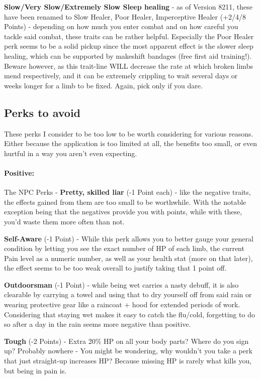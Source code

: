 \documentclass[11pt]{report}
\begin{document}
\textbf{Slow/Very Slow/Extremely Slow Sleep healing} - as of Version 8211, these have been renamed to Slow Healer, Poor Healer, Imperceptive Healer (+2/4/8 Points) - depending on how much you enter combat and on how careful you tackle said combat, these traits can be rather helpful. Especially the Poor Healer perk seems to be a solid pickup since the most apparent effect is the slower sleep healing, which can be supported by makeshift bandages (free first aid training!). Beware however, as this trait-line WILL decrease the rate at which broken limbs mend respectively, and it can be extremely crippling to wait several days or weeks longer for a limb to be fixed. Again, pick only if you dare.

\subsection{Perks to avoid}
These perks I consider to be too low to be worth considering for various reasons. Either because the application is too limited at all, the benefits too small, or even hurtful in a way you aren't even expecting.

\paragraph{Positive:}

The NPC Perks - \textbf{Pretty, skilled liar} (-1 Point each) - like the negative traits, the effects gained from them are too small to be worthwhile. With the notable exception being that the negatives provide you with points, while with these, you'd waste them more often than not.

\textbf{Self-Aware} (-1 Point) - While this perk allows you to better gauge your general condition by letting you see the exact number of HP of each limb, the current Pain level as a numeric number, as well as your health stat (more on that later), the effect seems to be too weak overall to justify taking that 1 point off.

\textbf{Outdoorsman} (-1 Point) - while being wet carries a nasty debuff, it is also clearable by carrying a towel and using that to dry yourself off from said rain or wearing protective gear like a raincoat + hood for extended periods of work. Considering that staying wet makes it easy to catch the flu/cold, forgetting to do so after a day in the rain seems more negative than positive.

\textbf{Tough} (-2 Points) - Extra 20\% HP on all your body parts? Where do you sign up? Probably nowhere - You might be wondering, why wouldn't you take a perk that just straight-up increases HP? Because missing HP is rarely what kills you, but being in pain is.
\end{document}
